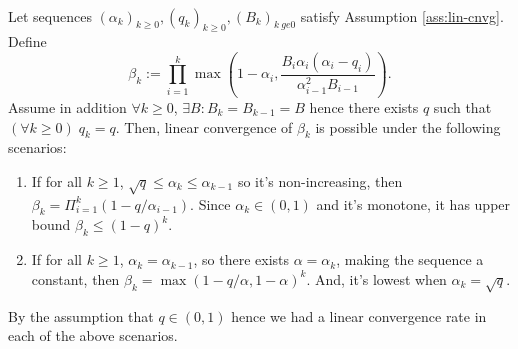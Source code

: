 \documentclass[12pt]{article}
\begin{document}
            \begin{lemma}\;\label{lemma:beta-seq}\\
                Let sequences $(\alpha_k)_{k \ge 0}, (q_k)_{k \ge 0}, (B_k)_{k \ ge 0}$ satisfy Assumption \ref{ass:lin-cnvg}. 
                Define 
                $$
                \beta_k := 
                \prod_{i = 1}^k\max\left(
                    1 - \alpha_i, 
                    \frac{B_i\alpha_i(\alpha_i - q_i)}{\alpha_{i - 1}^2B_{i - 1}}
                \right).
                $$
                Assume in addition $\forall k \ge 0$, $\exists B : B_k = B_{k - 1} = B$ hence there exists $q$ such that $(\forall k \ge 0)\; q_k = q$. 
                Then, linear convergence of $\beta_k$ is possible under the following scenarios: 
                \begin{enumerate}
                    \item If for all $k \ge 1$, $\sqrt{q} \le \alpha_k \le \alpha_{k - 1}$ so it's non-increasing, then $\beta_k = \Pi_{i = 1}^k(1 - q/\alpha_{i - 1})$.
                    Since $\alpha_k \in (0, 1)$ and it's monotone, it has upper bound $\beta_k \le (1 - q)^k$. 
                    \item If for all $k \ge 1$, $\alpha_k = \alpha_{k - 1}$, so there exists $\alpha = \alpha_k$, making the sequence a constant, then $\beta_k = \max(1 - q/\alpha, 1 - \alpha)^k$. And, it's lowest when $\alpha_k = \sqrt{q}$. 
                \end{enumerate}
                By the assumption that $q \in (0, 1)$ hence we had a linear convergence rate in each of the above scenarios. 
            \end{lemma}
\end{document}
